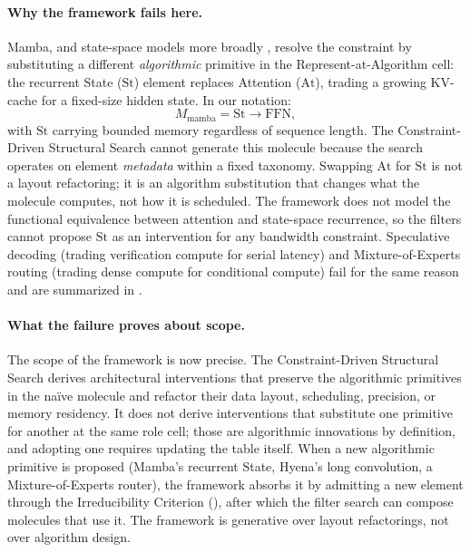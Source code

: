 \documentclass[10pt,twocolumn]{article}
\begin{document}
\paragraph{Why the framework fails here.} Mamba, and state-space models more broadly \citep{gu2023mamba}, resolve the constraint by substituting a different \emph{algorithmic} primitive in the Represent-at-Algorithm cell: the recurrent State ($\text{St}$) element replaces Attention ($\text{At}$), trading a growing KV-cache for a fixed-size hidden state. In our notation:
\begin{equation*}
M_{\text{mamba}} = \text{St} \rightarrow \text{FFN},
\end{equation*}
with $\text{St}$ carrying bounded memory regardless of sequence length. The Constraint-Driven Structural Search cannot generate this molecule because the search operates on element \emph{metadata} within a fixed taxonomy. Swapping $\text{At}$ for $\text{St}$ is not a layout refactoring; it is an algorithm substitution that changes what the molecule computes, not how it is scheduled. The framework does not model the functional equivalence between attention and state-space recurrence, so the filters cannot propose $\text{St}$ as an intervention for any bandwidth constraint. Speculative decoding (trading verification compute for serial latency) and Mixture-of-Experts routing (trading dense compute for conditional compute) fail for the same reason and are summarized in .

\paragraph{What the failure proves about scope.} The scope of the framework is now precise. The Constraint-Driven Structural Search derives architectural interventions that preserve the algorithmic primitives in the na\"ive molecule and refactor their data layout, scheduling, precision, or memory residency. It does not derive interventions that substitute one primitive for another at the same role cell; those are algorithmic innovations by definition, and adopting one requires updating the table itself. When a new algorithmic primitive is proposed (Mamba's recurrent State, Hyena's long convolution, a Mixture-of-Experts router), the framework absorbs it by admitting a new element through the Irreducibility Criterion (), after which the filter search can compose molecules that use it. The framework is generative over layout refactorings, not over algorithm design.
\end{document}
